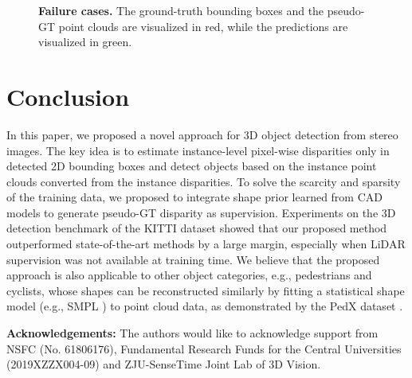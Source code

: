 \documentclass[10pt,twocolumn,letterpaper]{article}
\begin{document}
\begin{figure}
    \centering
    \centering
    \vspace{0.5em}
    \caption{\textbf{Failure cases.} The ground-truth bounding boxes and the pseudo-GT point clouds are visualized in {\color[rgb]{0.98,0.5,0.447}red}, while the predictions are visualized in {\color{green} green}.}
    \label{fig:failurecase}
\end{figure}  \section{Conclusion}
In this paper, we proposed a novel approach for 3D object detection from stereo images.
The key idea is to estimate instance-level pixel-wise disparities only in detected 2D bounding boxes and detect objects based on the instance point clouds converted from the instance disparities.
To solve the scarcity and sparsity of the training data, we proposed to integrate shape prior learned from CAD models to generate pseudo-GT disparity as supervision.
Experiments on the 3D detection benchmark of the KITTI dataset showed that our proposed method outperformed state-of-the-art methods by a large margin, especially when LiDAR supervision was not available at training time. We believe that the proposed approach is also applicable to other object categories, e.g., pedestrians and cyclists, whose shapes can be reconstructed similarly by fitting a statistical shape model (e.g., SMPL \cite{loper2015smpl}) to point cloud data, as demonstrated by the PedX dataset \cite{kimPedXBenchmarkDataset2018}. 
 
\vspace{1em}
\noindent\textbf{Acknowledgements:} 
The authors would like to acknowledge support from NSFC (No. 61806176), Fundamental Research Funds for the Central Universities (2019XZZX004-09) and ZJU-SenseTime Joint Lab of 3D Vision.

{\small

\normalem

}
\end{document}
